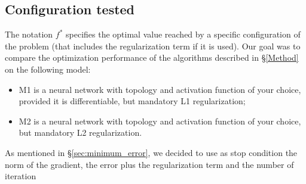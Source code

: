 \subsection{Configuration tested}
The notation $f^*$ specifies the optimal value reached by a specific configuration of the problem (that includes the regularization term if it is used). Our goal was to compare the optimization performance of the algorithms described in \S \ref{Method} on the following model: 
\begin{itemize}
	\item M1 is a neural network with topology and activation function of your choice, provided it is differentiable, but mandatory L1 regularization;
	\item M2 is a neural network with topology and activation function of your choice, but mandatory L2 regularization.
\end{itemize}
As mentioned in \S \ref{sec:minimum_error}, we decided to use as stop condition the norm of the gradient, the error plus the regularization term and the number of iteration 

